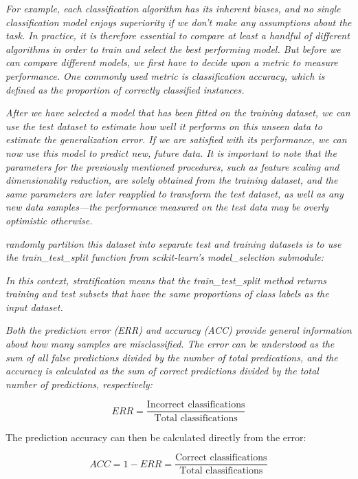 \textit{For example, each classification algorithm has its inherent biases, and no single classification model enjoys superiority if we don't make any assumptions about the task. In practice, it is therefore essential to compare at least a handful of different algorithms in order to train and select the best performing model. But before we can compare different models, we first have to decide upon a metric to measure performance. One commonly used metric is classification accuracy, which is defined as the proportion of correctly classified instances.}

\textit{After we have selected a model that has been fitted on the training dataset, we can use the test dataset to estimate how well it performs on this unseen data to estimate the generalization error. If we are satisfied with its performance, we can now use this model to predict new, future data. It is important to note that the parameters for the previously mentioned procedures, such as feature scaling and dimensionality reduction, are solely obtained from the training dataset, and the same parameters are later reapplied to transform the test dataset, as well as any new data samples—the performance measured on the test data may be overly optimistic otherwise.}

\textit{randomly partition this dataset into separate test and training datasets is to use the train_test_split function from scikit-learn's model_selection submodule:}

\textit{In this context, stratification means that the train\_test\_split method returns training and test subsets that have the same proportions of class labels as the input dataset.}

\textit{Both the prediction error (ERR) and accuracy (ACC) provide general information about how many samples are misclassified. The error can be understood as the sum of all false predictions divided by the number of total predications, and the accuracy is calculated as the sum of correct predictions divided by the total number of predictions, respectively:}

\begin{equation} \label{eq:prediction_error}
    ERR = \frac{\text{Incorrect classifications}} {\text{Total classifications}}
\end{equation}

The prediction accuracy can then be calculated directly from the error:

\begin{equation} \label{eq:prediction_accuracy}
    ACC = 1 - ERR = \frac{\text{Correct classifications}} {\text{Total classifications}}
\end{equation}

